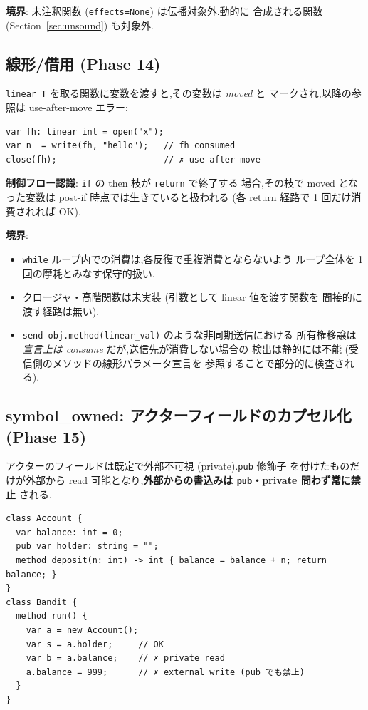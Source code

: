 \documentclass[11pt,a4paper]{article}
\newcommand{\code}[1]{\texttt{\small #1}}
\begin{document}
\textbf{境界}: 未注釈関数 (\code{effects=None}) は伝播対象外.動的に
合成される関数 (Section~\ref{sec:unsound}) も対象外.

\subsection{線形/借用 (Phase 14)}

\code{linear T} を取る関数に変数を渡すと,その変数は \emph{moved} と
マークされ,以降の参照は use-after-move エラー:

\begin{lstlisting}
var fh: linear int = open("x");
var n  = write(fh, "hello");   // fh consumed
close(fh);                     // ✗ use-after-move
\end{lstlisting}

\textbf{制御フロー認識}: \code{if} の then 枝が \code{return} で終了する
場合,その枝で moved となった変数は post-if 時点では生きていると扱われる
(各 return 経路で 1 回だけ消費されれば OK).

\textbf{境界}:

\begin{itemize}[leftmargin=1.5em]
\item \code{while} ループ内での消費は,各反復で重複消費とならないよう
      ループ全体を 1 回の摩耗とみなす保守的扱い.
\item クロージャ・高階関数は未実装 (引数として linear 値を渡す関数を
      間接的に渡す経路は無い).
\item \code{send obj.method(linear\_val)} のような非同期送信における
      所有権移譲は \emph{宣言上は consume} だが,送信先が消費しない場合の
      検出は静的には不能 (受信側のメソッドの線形パラメータ宣言を
      参照することで部分的に検査される).
\end{itemize}

\subsection{symbol\_owned: アクターフィールドのカプセル化 (Phase 15)}

アクターのフィールドは既定で外部不可視 (private).\code{pub} 修飾子
を付けたものだけが外部から read 可能となり,\textbf{外部からの書込みは
\code{pub}・private 問わず常に禁止} される.

\begin{lstlisting}
class Account {
  var balance: int = 0;
  pub var holder: string = "";
  method deposit(n: int) -> int { balance = balance + n; return balance; }
}
class Bandit {
  method run() {
    var a = new Account();
    var s = a.holder;     // OK
    var b = a.balance;    // ✗ private read
    a.balance = 999;      // ✗ external write (pub でも禁止)
  }
}
\end{lstlisting}
\end{document}
